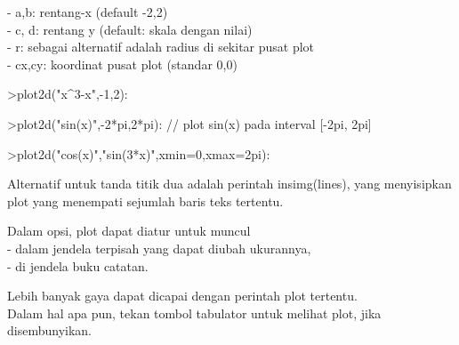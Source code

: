 \documentclass[12pt,Times new roman,letterpaper]{book}
\begin{document}
\begin{eulernootebook}
\begin{eulercomment}
\begin{eulercomment}
\begin{eulernootebook}
\begin{eulercomment}
\begin{eulercomment}
\begin{eulercomment}
\begin{eulercomment}
\begin{eulercomment}
\begin{eulercomment}
\begin{eulercomment}
\begin{eulernotebook}
\begin{eulercomment}
\begin{eulercomment}
\begin{eulercomment}
-   a,b: rentang-x (default -2,2)\\
-   c, d: rentang y (default: skala dengan nilai)\\
-   r: sebagai alternatif adalah radius di sekitar pusat plot\\
-   cx,cy: koordinat pusat plot (standar 0,0)
\end{eulercomment}
\begin{eulerprompt}
>plot2d("x^3-x",-1,2):
\end{eulerprompt}
\begin{eulerprompt}
>plot2d("sin(x)",-2*pi,2*pi): // plot sin(x) pada interval [-2pi, 2pi]
\end{eulerprompt}
\begin{eulerprompt}
>plot2d("cos(x)","sin(3*x)",xmin=0,xmax=2pi):
\end{eulerprompt}
\begin{eulercomment}
Alternatif untuk tanda titik dua adalah perintah insimg(lines), yang
menyisipkan plot yang menempati sejumlah baris teks tertentu.

Dalam opsi, plot dapat diatur untuk muncul\\
- dalam jendela terpisah yang dapat diubah ukurannya,\\
- di jendela buku catatan.

Lebih banyak gaya dapat dicapai dengan perintah plot tertentu.\\
Dalam hal apa pun, tekan tombol tabulator untuk melihat plot, jika
disembunyikan.


\end{eulercomment}
\end{eulercomment}
\end{eulercomment}
\end{eulernotebook}
\end{eulercomment}
\end{eulercomment}
\end{eulercomment}
\end{eulercomment}
\end{eulercomment}
\end{eulercomment}
\end{eulercomment}
\end{eulernootebook}
\end{eulercomment}
\end{eulercomment}
\end{eulernootebook}
\end{document}
